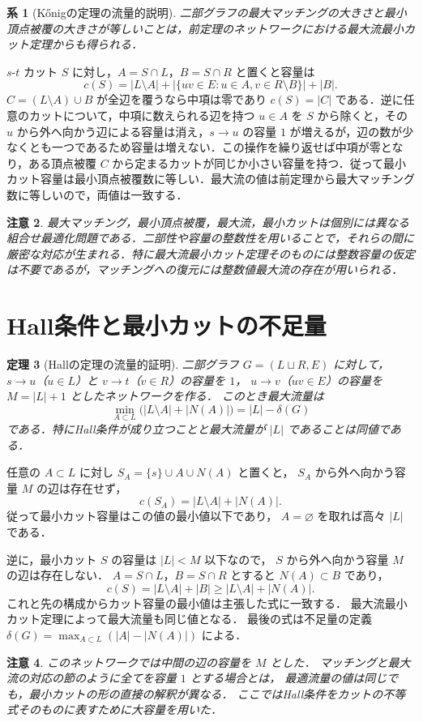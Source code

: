 \documentclass[a5paper,10pt,onecolumn]{jsarticle}
\makeatletter
\theoremstyle{mathnotetheorem}
\newtheorem{theorem}{定理}[section]
\newtheorem{corollary}[theorem]{系}
\newtheorem{remark}[theorem]{注意}
\renewcommand{\proofname}{証明}
\renewenvironment{proof}[1][\proofname]{%
  \par\pushQED{\qed}\normalfont\topsep4\p@\@plus2\p@\relax
  \trivlist\item[\hskip\labelsep\bfseries #1]\ignorespaces
}{\popQED\endtrivlist\@endpefalse}
\makeatother
\begin{document}
\begin{corollary}[K\H{o}nigの定理の流量的説明]
二部グラフの最大マッチングの大きさと最小頂点被覆の大きさが等しいことは，前定理のネットワークにおける最大流最小カット定理からも得られる．
\end{corollary}
\begin{proof}
$s$-$t$ カット $S$ に対し，$A=S\cap L$，$B=S\cap R$ と置くと容量は
\[
 c(S)=|L\setminus A|+|\{uv\in E:u\in A,v\in R\setminus B\}|+|B|.
\]
$C=(L\setminus A)\cup B$ が全辺を覆うなら中項は零であり $c(S)=|C|$ である．逆に任意のカットについて，中項に数えられる辺を持つ $u\in A$ を $S$ から除くと，その $u$ から外へ向かう辺による容量は消え，$s\to u$ の容量 $1$ が増えるが，辺の数が少なくとも一つであるため容量は増えない．この操作を繰り返せば中項が零となり，ある頂点被覆 $C$ から定まるカットが同じか小さい容量を持つ．従って最小カット容量は最小頂点被覆数に等しい．最大流の値は前定理から最大マッチング数に等しいので，両値は一致する．
\end{proof}

\begin{remark}
最大マッチング，最小頂点被覆，最大流，最小カットは個別には異なる組合せ最適化問題である．二部性や容量の整数性を用いることで，それらの間に厳密な対応が生まれる．特に最大流最小カット定理そのものには整数容量の仮定は不要であるが，マッチングへの復元には整数値最大流の存在が用いられる．
\end{remark}


\section{Hall条件と最小カットの不足量}
\begin{theorem}[Hallの定理の流量的証明]
二部グラフ $G=(L\sqcup R,E)$ に対して，
$s\to u$（$u\in L$）と $v\to t$（$v\in R$）の容量を $1$，
$u\to v$（$uv\in E$）の容量を $M=|L|+1$ としたネットワークを作る．
このとき最大流量は
\[
 \min_{A\subset L}\bigl(|L\setminus A|+|N(A)|\bigr)
 =|L|-\delta(G)
\]
である．特にHall条件が成り立つことと最大流量が $|L|$ であることは同値である．
\end{theorem}
\begin{proof}
任意の $A\subset L$ に対し
$S_A=\{s\}\cup A\cup N(A)$ と置くと，
$S_A$ から外へ向かう容量 $M$ の辺は存在せず，
\[
 c(S_A)=|L\setminus A|+|N(A)|.
\]
従って最小カット容量はこの値の最小値以下であり，
$A=\varnothing$ を取れば高々 $|L|$ である．

逆に，最小カット $S$ の容量は $|L|<M$ 以下なので，
$S$ から外へ向かう容量 $M$ の辺は存在しない．
$A=S\cap L$，$B=S\cap R$ とすると $N(A)\subset B$ であり，
\[
 c(S)=|L\setminus A|+|B|
 \ge |L\setminus A|+|N(A)|.
\]
これと先の構成からカット容量の最小値は主張した式に一致する．
最大流最小カット定理によって最大流量も同じ値となる．
最後の式は不足量の定義
$\delta(G)=\max_{A\subset L}(|A|-|N(A)|)$ による．
\end{proof}
\begin{remark}
このネットワークでは中間の辺の容量を $M$ とした．
マッチングと最大流の対応の節のように全てを容量 $1$ とする場合とは，
最適流量の値は同じでも，最小カットの形の直接の解釈が異なる．
ここではHall条件をカットの不等式そのものに表すために大容量を用いた．
\end{remark}
\end{document}
